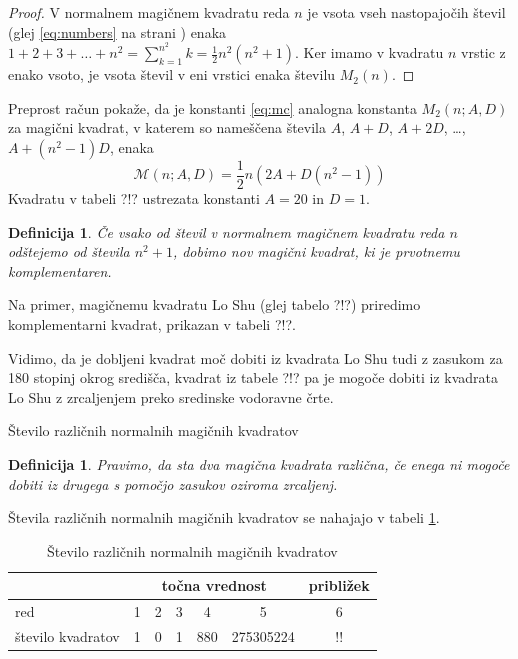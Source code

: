 \documentclass[a4paper,12pt]{article}
\newcommand{\pojem}[1]{\emph{\color{purple}#1}}
\newtheorem{definicija}[izrek]{Definicija}
\begin{document}
   \begin{proof}
      V normalnem magičnem kvadratu reda $n$ je vsota vseh nastopajočih
      števil (glej \ref{eq:numbers} na strani \pageref{eq:numbers}) enaka
      $1+2+3+\dots+n^2=\sum_{k=1}^{n^2}k=\frac{1}{2}n^2(n^2+1)$. Ker imamo
      v kvadratu $n$ vrstic z enako vsoto, je vsota števil v eni vrstici
      enaka številu $M_2(n)$. %
   \end{proof}

Preprost račun pokaže, da je konstanti \ref{eq:mc} analogna konstanta
$M_2(n;A,D)$ za magični kvadrat, v katerem so nameščena števila
$A$, $A+D$, $A+2D$, \dots, $A+(n^2-1)D$, enaka %
$$\mathcal{M}(n;A,D)=\frac{1}{2}n(2A + D(n^2-1))$$
Kvadratu v tabeli ?!? ustrezata konstanti $A=20$ in $D=1$.

\begin{definicija}
      Če vsako od števil v normalnem magičnem kvadratu reda $n$ odštejemo
      od števila $n^2+1$, dobimo nov magični kvadrat, ki je prvotnemu
      \pojem{komplementaren}.
\end{definicija}

Na primer, magičnemu kvadratu Lo Shu (glej tabelo ?!?) priredimo
komplementarni kvadrat, prikazan v tabeli ?!?.
%

Vidimo, da je dobljeni kvadrat moč dobiti iz kvadrata Lo Shu tudi z zasukom za
180 stopinj okrog središča, kvadrat iz tabele ?!? pa je mogoče dobiti
iz kvadrata Lo Shu z zrcaljenjem preko sredinske vodoravne črte.

Število različnih normalnih magičnih kvadratov

\begin{definicija}
      Pravimo, da sta dva magična kvadrata \pojem{različna}, če enega ni mogoče dobiti
      iz drugega s pomočjo zasukov oziroma zrcaljenj.
\end{definicija}

Števila različnih normalnih magičnih kvadratov se nahajajo v tabeli \ref{table:stevila}.

\begin{table}
   \centering
   \begin{tabular}{lcccccc}\toprule
      & \multicolumn{5}{c}{točna vrednost} &približek \\ \midrule
      red &1 &2 &3 &4 &5 &6 \\\hline
      število kvadratov &1 &0 &1 &880 &275305224 &!! \\\bottomrule
   \end{tabular}
   \caption{Število različnih normalnih magičnih kvadratov}
   \label{table:stevila}
\end{table}
\end{document}
